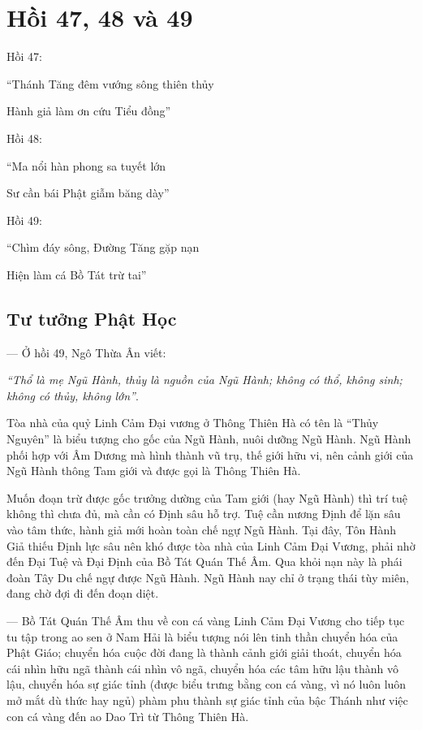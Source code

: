 \chapter{Hồi 47, 48 và 49} %
\label{cha:hoi_47_48}

Hồi 47:

\begin{itshape}
``Thánh Tăng đêm vướng sông thiên thủy

Hành giả làm ơn cứu Tiểu đồng''
\end{itshape}

Hồi 48:

\begin{itshape}
``Ma nổi hàn phong sa tuyết lớn

Sư cần bái Phật giẫm băng dày''
\end{itshape}

Hồi 49:

\begin{itshape}
``Chìm đáy sông, Đường Tăng gặp nạn

Hiện làm cá Bồ Tát trừ tai''
\end{itshape}

\section{Tư tưởng Phật Học} %
\label{sec:47_48_phat_hoc}

— Ở hồi 49, Ngô Thừa Ân viết:

\emph{``Thổ là mẹ Ngũ Hành, thủy là nguồn của Ngũ Hành; không có thổ, không sinh; không có thủy, không lớn''}.

Tòa nhà của quỷ Linh Cảm Đại vương ở Thông Thiên Hà có tên là ``Thủy Nguyên'' là biểu tượng cho gốc của Ngũ Hành, nuôi dưỡng Ngũ Hành. Ngũ Hành phối hợp với Âm Dương mà hình thành vũ trụ, thế giới hữu vi, nên cảnh giới của Ngũ Hành thông Tam giới và được gọi là Thông Thiên Hà.

Muốn đoạn trừ được gốc trưởng dường của Tam giới (hay Ngũ Hành) thì trí tuệ không thì chưa đủ, mà cần có Định sâu hỗ trợ. Tuệ cần nương Định để lặn sâu vào tâm thức, hành giả mới hoàn toàn chế ngự Ngũ Hành. Tại đây, Tôn Hành Giả thiếu Định lực sâu nên khó được tòa nhà của Linh Cảm Đại Vương, phải nhờ đến Đại Tuệ và Đại Định của Bồ Tát Quán Thế Âm. Qua khỏi nạn này là phái đoàn Tây Du chế ngự được Ngũ Hành. Ngũ Hành nay chỉ ở trạng thái tùy miên, đang chờ đợi đi đến đoạn diệt.

— Bồ Tát Quán Thế Âm thu về con cá vàng Linh Cảm Đại Vương cho tiếp tục tu tập trong ao sen ở Nam Hải là biểu tượng nói lên tinh thần chuyển hóa của Phật Giáo; chuyển hóa cuộc đời đang là thành cảnh giới giải thoát, chuyển hóa cái nhìn hữu ngã thành cái nhìn vô ngã, chuyển hóa các tâm hữu lậu thành vô lậu, chuyển hóa sự giác tỉnh (được biểu trưng bằng con cá vàng, vì nó luôn luôn mở mắt dù thức hay ngủ) phàm phu thành sự giác tỉnh của bậc Thánh như việc con cá vàng đến ao Dao Trì từ Thông Thiên Hà.

